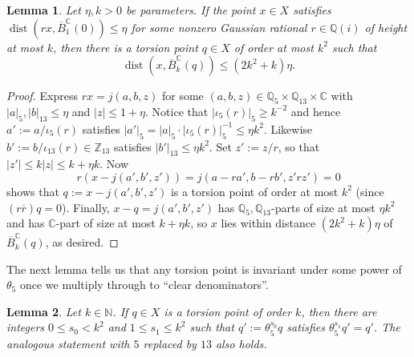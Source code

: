 \documentclass[11pt]{amsart}
\newtheorem{lemma}{Lemma}[section]
\theoremstyle{definition}
\newcommand{\C}{{\mathbb C}}
\newcommand{\Q}{{\mathbb Q}}
\DeclareMathOperator{\dist}{dist}
\begin{document}
\begin{lemma}\label{lem:rationalclosetoball}
Let $\eta,k>0$ be parameters. %
If the point $x \in X$ satisfies $\dist(rx, \overline B_1^{\mathbb{C}}(0))\leq \eta$ for some nonzero Gaussian rational $r \in \mathbb{Q}(i)$ of height at most $k$, then there is a torsion point $q \in X$ of order at most $k^2$ such that
$$\dist(x, \overline B_{k}^\mathbb{C}(q)) \le (2k^2 + k)\eta.$$
\end{lemma}
\begin{proof}
Express $rx = j(a, b, z)$ for some $(a,b,z) \in \Q_5 \times \Q_{13} \times \C$ with $|a|_5, |b|_{13} \leq \eta $ and $|z| \leq 1 + \eta$.  
Notice that $|\iota_5(r)|_5 \geq k^{-2}$ and hence $a':=a/\iota_5(r)$ satisfies $|a'|_5=|a|_5 \cdot |\iota_5(r)|_5^{-1} \leq \eta k^2$.
Likewise $b':=b/\iota_{13}(r) \in \mathbb{Z}_{13}$ satisfies $|b'|_{13} \leq \eta k^2$.  Set $z':=z/r$, so that $|z'| \leq k|z| \leq k+\eta k$.  Now
$$r(x-j(a',b',z'))=j(a-ra',b-rb',z'rz')=0$$
shows that $q:=x-j(a',b',z')$ is a torsion point of order at most $k^2$ (since $(r\overline{r})q=0$).  Finally, $x-q=j(a',b',z')$ has $\Q_5,\Q_{13}$-parts of size at most $\eta k^2$ and has $\mathbb{C}$-part of size at most $k+\eta k$, so $x$ lies within distance $(2k^2+k)\eta$ of $\overline{B}_k^{\C}(q)$, as desired.
\end{proof}

The next lemma tells us that any torsion point is invariant under some power of $\theta_5$ once we multiply through to ``clear denominators''.
\begin{lemma}\label{lem:torsion-clear-denom}
Let $k \in \mathbb{N}$.  If $q \in X$ is a torsion point of order $k$, then there are integers $0 \leq s_0 <k^2$ and $1\leq s_1 \leq k^2$ such that $q':=\theta_5^{s_0}q$ satisfies $\theta_5^{s_1}q'=q'$.  The analogous statement with $5$ replaced by $13$ also holds.
\end{lemma}
\end{document}
